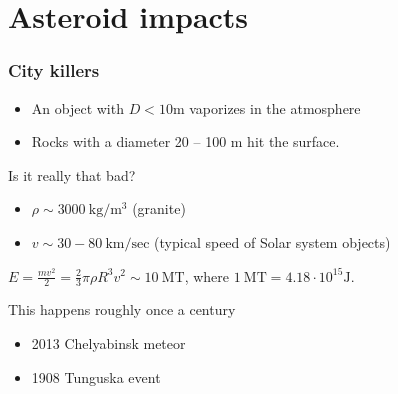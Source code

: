 \documentclass{beamer}
\begin{document}
\section{Asteroid impacts}

\begin{frame}
\frametitle{City killers}
\begin{itemize}
\item An object with $D < 10 \mathrm{m}$ vaporizes in the atmosphere
\item Rocks with a diameter 20 -- 100 m hit the surface.
\end{itemize}

\begin{block}{Is it really that bad?}
\begin{itemize}
\item $\rho \sim 3000 \: \mathrm{kg/m^3}$ (granite)
\item $v \sim 30 - 80 \: \mathrm{km/sec}$ (typical speed of Solar system objects)
\end{itemize}
$E = \frac{m v^2}{2} = \frac{2}{3} \pi \rho R^3 v^2 \sim 10 \: \mathrm{MT}$,
where $1 \: \mathrm{MT} = 4.18 \cdot 10^{15} \mathrm{J}$.
\end{block}
\begin{block}{This happens roughly once a century}
\begin{itemize}
\item 2013 Chelyabinsk meteor 
\item 1908 Tunguska event
\end{itemize}
\end{block}
\end{frame}
\end{document}
